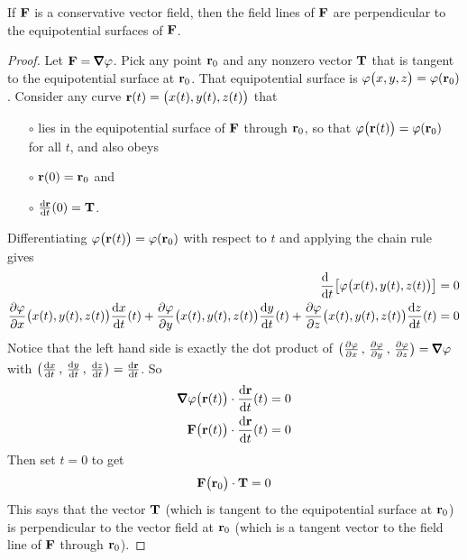 \begin{lemma}[Optional]\label{lem:equipotential}
If $\mathbf{F}$ is a conservative vector field, then the field lines of $\mathbf{F}$
are perpendicular to the equipotential surfaces of $\mathbf{F}$.
\end{lemma}
\begin{proof}
Let $\vF=\vnabla\varphi$. 
Pick any point $\mathbf{r}_0$ and any nonzero vector $\mathbf{T}$ 
that is tangent to the equipotential surface at $\mathbf{r}_0$. That
equipotential surface is  $\varphi\big(x,y,z\big)=\varphi(\mathbf{r}_0)$.
Consider any curve $\mathbf{r}(t)=\big(x(t),y(t),z(t)\big)$ that 
\begin{itemize}\itemsep1pt \parskip0pt  %
\item[$\circ$]
lies in the equipotential surface of $\mathbf{F}$ through $\mathbf{r}_0$,
so that $\varphi\big(\mathbf{r}(t)\big)=\varphi(\mathbf{r}_0)$ for all $t$, 
and also obeys
\item[$\circ$]
$\mathbf{r}(0)=\mathbf{r}_0$ and
\item[$\circ$]
$\diff{\vr}{t}(0) = \vT$.
\end{itemize}
Differentiating $\varphi\big(\mathbf{r}(t)\big)=\varphi(\mathbf{r}_0)$
with respect to $t$ and applying the chain rule gives
\begin{align*}
\diff{\ }{t}\big[\varphi\big(x(t),y(t),z(t)\big)\big] &=0 \\
\frac{\partial\varphi}{\partial x}\big(x(t),y(t),z(t)\big)\diff{x}{t}(t)
+\frac{\partial\varphi}{\partial y}\big(x(t),y(t),z(t)\big)\diff{y}{t}(t)
+\frac{\partial\varphi}{\partial z}\big(x(t),y(t),z(t)\big)\diff{z}{t}(t)
&=0 
\end{align*}
Notice that the left hand side is exactly the dot product
of $\big(\frac{\partial\varphi}{\partial x}
\,,\,\frac{\partial\varphi}{\partial y}
\,,\,\frac{\partial\varphi}{\partial z}\big)=\vnabla\varphi$ 
with
$\big(\diff{x}{t}
\,,\,\diff{y}{t}
\,,\,\diff{z}{t}\big)
=\diff{\vr}{t}$.
So
\begin{align*}
\vnabla\varphi\big(\vr(t)\big)\cdot\diff{\vr}{t}(t) &= 0 \\
 \vF\big(\vr(t)\big)\cdot\diff{\vr}{t}(t) &= 0
\end{align*}
Then set $t=0$ to get
\begin{equation*}
 \mathbf{F}\big(\mathbf{r}_0\big)\cdot\mathbf{T} = 0
\end{equation*}
This says that the vector $\mathbf{T}$ (which is tangent to the equipotential 
surface at $\mathbf{r}_0$) is perpendicular 
to the vector field at $\mathbf{r}_0$ (which is a tangent vector to the 
field line of $\mathbf{F}$ through $\mathbf{r}_0$).
\end{proof}

